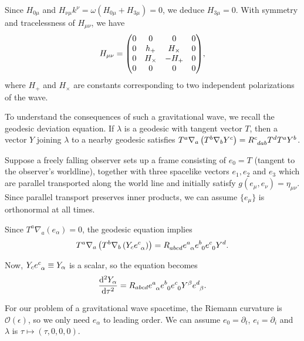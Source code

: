Since $H_{0 \mu}$ and $H_{\nu \mu} k^{\nu} = \omega \left( H_{0 \mu} + H_{3\mu} \right) = 0$, we deduce $H_{3\mu} = 0$. With symmetry and tracelessness of $H_{\mu \nu}$, we have
\begin{align}
    H_{\mu \nu} = \mqty( 0 & 0 & 0& 0 \\
    0 & h_+ & H_{\times } & 0 \\ 
    0 & H_{\times } & -H_+ & 0 \\
    0 & 0 & 0 & 0 )
,\end{align}
where $H_{+}$ and $H_{\times }$ are constants corresponding to two independent polarizations of the wave.

To understand the consequences of such a gravitational wave, we recall the geodesic deviation equation. If $\lambda$ is a geodesic with tangent vector $T$, then a vector $Y$ joining $\lambda$ to a nearby geodesic satisfies $T^{a} \nabla_a \left( T^{b} \nabla_b Y^{c} \right) = \tensor{R}{^{c}_{dab}} T^{d} T^{a} Y^{b}$.

Suppose a freely falling observer sets up a frame consisting of $e_0 = T$ (tangent to the observer's worldline), together with three spacelike vectors $e_1, e_2$ and $e_3$ which are parallel transported along the world line and initially satisfy $g\left( e_\mu, e_\nu \right) = \eta_{\mu \nu}$. Since parallel transport preserves inner products, we can assume $\{e_{\mu}\} $ is orthonormal at all times.

Since $T^{a} \nabla_a \left( e_\alpha \right) = 0$, the geodesic equation implies
\begin{align}
    T^{a} \nabla_a \left( T^{b} \nabla_b \left( Y_c \tensor{e}{^{c}_\alpha} \right)  \right) = \tensor{R}{_{abcd}} \tensor{e}{^{a}_\alpha} \tensor{e}{^{b}_{0}} \tensor{e}{^{c}_{0}} Y^{d}
.\end{align}

Now, $Y_c \tensor{e}{^{c}_\alpha} \equiv Y_{\alpha}$ is a scalar, so the equation becomes 
\begin{align}
    \dv[2]{Y_\alpha}{\tau} = R_{abcd} \tensor{e}{^{a}_\alpha} \tensor{e}{^{b}_0} \tensor{e}{^{c}_0} \tensor{Y}{^{\beta}} \tensor{e}{^{d}_\beta}
.\end{align}

For our problem of a gravitational wave spacetime, the Riemann curvature is $\mathcal{O}\left( \epsilon \right) $, so we only need $e_\alpha$ to leading order. We can assume $e_0 = \partial_t$, $e_i = \partial_i$ and $\lambda$ is $\tau \mapsto \left( \tau,0,0,0 \right) $.

